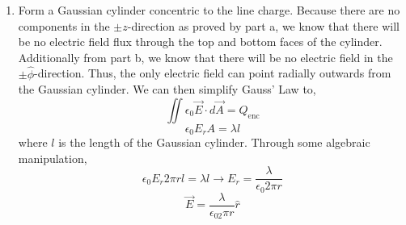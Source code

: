 \documentclass[12pt]{article}
\begin{document}
\begin{enumerate}
\begin{enumerate}
		\item [c.]
		Form a Gaussian cylinder concentric to the line charge.
		Because there are no components in the $\pm z$-direction as proved by part a, we know that there will be no electric field flux through the top and bottom faces of the cylinder.
		Additionally from part b, we know that there will be no electric field in the $\pm \hat \phi$-direction.
		Thus, the only electric field can point radially outwards from the Gaussian cylinder.
		We can then simplify Gauss' Law to,
		\[\iint \epsilon_0\vec E \cdot d\vec A = Q_{\mathrm{enc}}\]
		\[\epsilon_0E_rA = \lambda l\]
		where $l$ is the length of the Gaussian cylinder.
		Through some algebraic manipulation,
		\[\epsilon_0E_r2\pi rl = \lambda l \to E_r = \frac{\lambda}{\epsilon_0 2\pi r}\]
		\[\boxed{\vec E = \frac{\lambda}{\epsilon_02\pi r}\hat r}\]

		
	\end{enumerate}

	
\end{enumerate}

		
\end{document}
